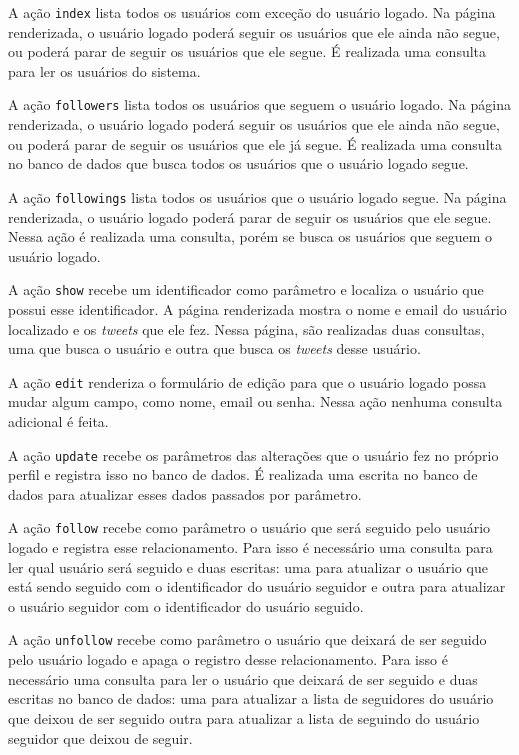 A ação \verb|index| lista todos os usuários com exceção do usuário logado. Na página renderizada, o usuário logado poderá seguir os usuários que ele ainda não segue, ou poderá parar de seguir os usuários que ele segue. É realizada uma consulta para ler os usuários do sistema.

A ação \verb|followers| lista todos os usuários que seguem o usuário logado. Na página renderizada, o usuário logado poderá seguir os usuários que ele ainda não segue, ou poderá parar de seguir os usuários que ele já segue. É realizada uma consulta no banco de dados que busca todos os usuários que o usuário logado segue.

A ação \verb|followings| lista todos os usuários que o usuário logado segue. Na página renderizada, o usuário logado poderá parar de seguir os usuários que ele segue. Nessa ação é realizada uma consulta, porém se busca os usuários que seguem o usuário logado.

A ação \verb|show| recebe um identificador como parâmetro e localiza o usuário que possui esse identificador. A página renderizada mostra o nome e email do usuário localizado e os \textit{tweets} que ele fez. Nessa página, são realizadas duas consultas, uma que busca o usuário e outra que busca os \textit{tweets} desse usuário.

A ação \verb|edit| renderiza o formulário de edição para que o usuário logado possa mudar algum campo, como nome, email ou senha. Nessa ação nenhuma consulta adicional é feita.

A ação \verb|update| recebe os parâmetros das alterações que o usuário fez no próprio perfil e registra isso no banco de dados. É realizada uma escrita no banco de dados para atualizar esses dados passados por parâmetro.

A ação \verb|follow| recebe como parâmetro o usuário que será seguido pelo usuário logado e registra esse relacionamento. Para isso é necessário uma consulta para ler qual usuário será seguido e duas escritas: uma para atualizar o usuário que está sendo seguido com o identificador do usuário seguidor e outra para atualizar o usuário seguidor com o identificador do usuário seguido.

A ação \verb|unfollow| recebe como parâmetro o usuário que deixará de ser seguido pelo usuário logado e apaga o registro desse relacionamento. Para isso é necessário uma consulta para ler o usuário que deixará de ser seguido e duas escritas no banco de dados: uma para atualizar a lista de seguidores do usuário que deixou de ser seguido outra para atualizar a lista de seguindo do usuário seguidor que deixou de seguir.

